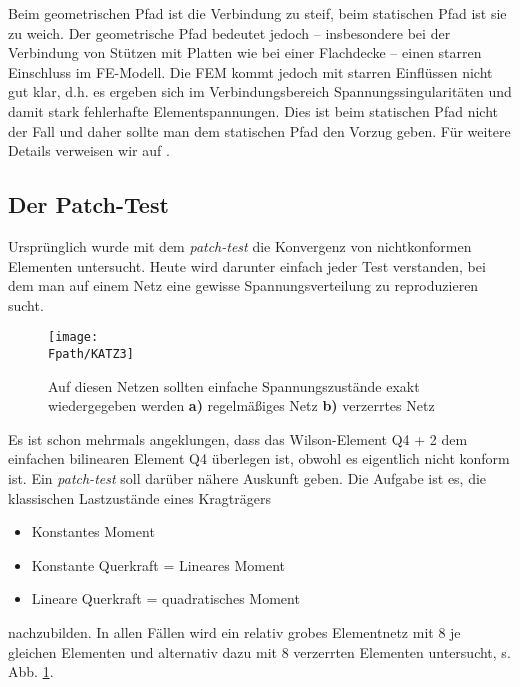 {\begin{remark}
Beim geometrischen Pfad ist die Verbindung zu steif, beim statischen Pfad ist sie zu weich. Der geometrische Pfad bedeutet jedoch -- insbesondere bei der Verbindung von St\"{u}tzen mit Platten wie bei einer Flachdecke -- einen starren Einschluss im FE-Modell. Die FEM kommt jedoch mit starren Einfl\"{u}ssen nicht gut klar, d.h. es ergeben sich im Verbindungsbereich Spannungssingularit\"{a}ten und damit stark fehlerhafte Elementspannungen. Dies ist beim statischen Pfad nicht der Fall und daher sollte man dem statischen Pfad den Vorzug geben. F\"{u}r weitere Details verweisen wir auf  \cite{Werkle2}.
\end{remark}

{\textcolor{sectionTitleBlue}{\section{Der Patch-Test}}}\label{patch-test}
Urspr\"{u}nglich wurde mit dem  {\em patch-test\/} die Konvergenz von nichtkonformen Elementen untersucht. Heute wird darunter einfach jeder Test verstanden, bei dem man auf einem Netz eine gewisse Spannungsverteilung zu reproduzieren sucht.
\begin{figure}[tbp] \centering
\if {} \sidecaption \fi
\texttt{[image: \\Fpath/KATZ3]}
\caption{Auf diesen Netzen sollten einfache Spannungszust\"{a}nde exakt wiedergegeben werden
{\bf a)} regelm\"{a}{\ss}iges Netz {\bf b)} verzerrtes Netz} \label{KATZ3}
\end{figure}%

Es ist schon mehrmals angeklungen, dass das Wilson-Element Q4 + 2 dem einfachen bilinearen Element Q4 \"{u}berlegen ist, obwohl es eigentlich nicht konform ist. Ein {\em patch-test\/} soll dar\"{u}ber n\"{a}here Auskunft geben. Die Aufgabe ist es, die klassischen Lastzust\"{a}nde eines Kragtr\"{a}gers\\

\begin{itemize}
\item  Konstantes Moment
\item  Konstante Querkraft = Lineares Moment
\item  Lineare Querkraft = quadratisches Moment
\end{itemize}
nachzubilden. In allen F\"{a}llen wird ein relativ grobes Elementnetz mit 8 je gleichen Elementen und alternativ dazu mit 8 verzerrten Elementen untersucht, s. Abb. \ref{KATZ3}.

}
